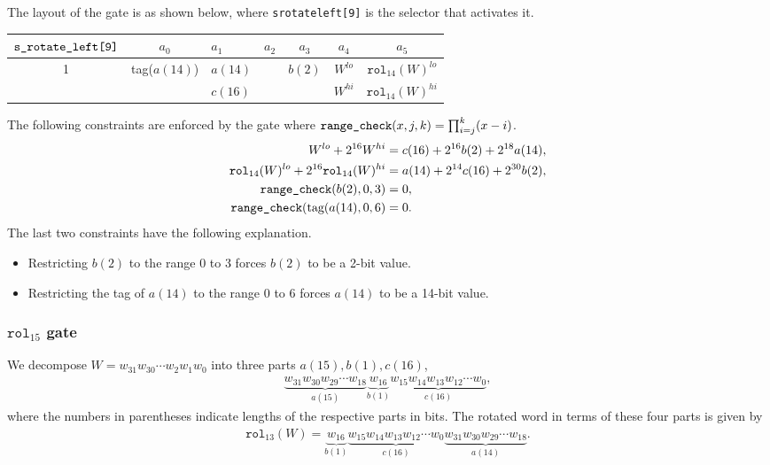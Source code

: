 \documentclass[10pt]{article}
\begin{document}
The layout of the gate is as shown below, where \texttt{s\textunderscore rotate\textunderscore left[9]} is the selector that activates it.

\begin{center}
  \begin{tabular}{c|c|l|l|c|c|c}
    $\texttt{s\textunderscore rotate\textunderscore left[9]}$ & $a_0$ & $a_1$ & $a_2$ & $a_3$ & $a_4$ & $a_5$ \\ \hline
    1  & tag($a(14)$) & $a(14)$ &                        & $b(2)$      & $W^{lo}$  & $\texttt{rol}_{14}(W)^{lo}$  \\ 
       &              & $c(16)$ &                        &             & $W^{hi}$  & $\texttt{rol}_{14}(W)^{hi}$  \\ \hline
  \end{tabular}
\end{center}

The following constraints are enforced by the gate where $\texttt{range\textunderscore check}(x, j, k) = \prod_{i=j}^k (x-i)$.
\begin{align*}
  W^{lo} + 2^{16} W^{hi} & = c(16) + 2^{16} b(2) + 2^{18} a(14),\\
  \texttt{rol}_{14}(W)^{lo} + 2^{16} \texttt{rol}_{14}(W)^{hi} & = a(14) + 2^{14} c(16) + 2^{30} b(2),\\
  \texttt{range\textunderscore check}(b(2), 0, 3) & = 0,\\
  \texttt{range\textunderscore check}(\text{tag}(a(14), 0, 6) & = 0.
\end{align*}
The last two constraints have the following explanation.
\begin{itemize}
\item Restricting $b(2)$ to the range 0 to 3 forces $b(2)$ to be a 2-bit value.
\item Restricting the tag of $a(14)$ to the range 0 to 6 forces $a(14)$ to be a 14-bit value.
\end{itemize}

\subsubsection{$\texttt{rol}_{15}$ gate}%
\label{sec:rol_15_gate}
We decompose $W = w_{31}w_{30}\cdots w_2w_1w_0$ into three parts $a(15), b(1), c(16)$,
\begin{align*}
  \underbrace{w_{31}w_{30}w_{29}\cdots w_{18}}_{a(15)} \underbrace{w_{16}}_{b(1)}
  \underbrace{w_{15}w_{14}w_{13}w_{12}\cdots w_{0}}_{c(16)},
\end{align*}
where the numbers in parentheses indicate lengths of the respective parts in bits. The rotated word in terms of these four parts is given by
\begin{align*}
  \texttt{rol}_{13}(W) = 
  \underbrace{w_{16}}_{b(1)}
  \underbrace{w_{15}w_{14}w_{13}w_{12}\cdots w_{0}}_{c(16)}\underbrace{w_{31}w_{30}w_{29}\cdots w_{18}}_{a(14)}.
\end{align*}
\end{document}

